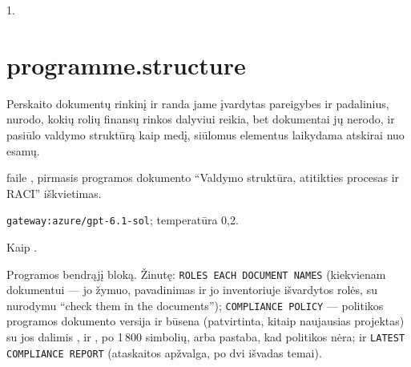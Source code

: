  1.


\section{programme.structure}\label{sec:aprompts:programme-structure}

 Perskaito dokumentų rinkinį ir randa jame įvardytas pareigybes ir
padalinius, nurodo, kokių rolių finansų rinkos dalyviui reikia, bet dokumentai jų nerodo, ir
pasiūlo valdymo struktūrą kaip medį, siūlomus elementus laikydama atskirai nuo esamų.

  faile , pirmasis
programos dokumento \enquote{Valdymo struktūra, atitikties procesas ir RACI} iškvietimas.

 \texttt{gateway:azure/gpt-6.1-sol}; temperatūra 0,2.

 Kaip .

 Programos bendrąjį bloką. Žinutę:
\texttt{ROLES EACH DOCUMENT NAMES} (kiekvienam dokumentui --- jo žymuo, pavadinimas ir jo
inventoriuje išvardytos rolės, su nurodymu \enquote{check them in the documents});
\texttt{COMPLIANCE POLICY} --- politikos programos dokumento versija ir būsena (patvirtinta,
kitaip naujausias projektas) su jos dalimis ,  ir ,
po 1\,800 simbolių, arba pastaba, kad politikos nėra; ir \texttt{LATEST COMPLIANCE REPORT}
(ataskaitos apžvalga, po dvi išvadas temai).

